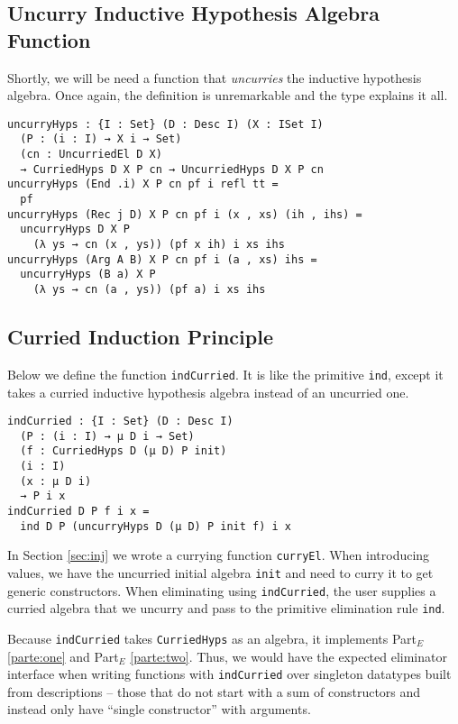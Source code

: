 \documentclass[preprint,nonatbib]{sigplanconf}
\newcommand{\refsec}[1]{Section \ref{sec:#1}}
\newcommand{\refparte}[1]{Part$_E$ \ref{parte:#1}}
\begin{document}
\subsection{Uncurry Inductive Hypothesis Algebra Function}

Shortly, we will be need a function that {\it uncurries} the inductive
hypothesis algebra. Once again, the definition is unremarkable and the
type explains it all.

\begin{verbatim}
uncurryHyps : {I : Set} (D : Desc I) (X : ISet I)
  (P : (i : I) → X i → Set)
  (cn : UncurriedEl D X)
  → CurriedHyps D X P cn → UncurriedHyps D X P cn
uncurryHyps (End .i) X P cn pf i refl tt =
  pf
uncurryHyps (Rec j D) X P cn pf i (x , xs) (ih , ihs) =
  uncurryHyps D X P
    (λ ys → cn (x , ys)) (pf x ih) i xs ihs
uncurryHyps (Arg A B) X P cn pf i (a , xs) ihs =
  uncurryHyps (B a) X P
    (λ ys → cn (a , ys)) (pf a) i xs ihs
\end{verbatim}

\subsection{Curried Induction Principle}

Below we define
the function {\tt indCurried}. It is like the primitive {\tt ind},
except it takes a curried inductive hypothesis algebra instead of an
uncurried one. 

\begin{verbatim}
indCurried : {I : Set} (D : Desc I)
  (P : (i : I) → μ D i → Set)
  (f : CurriedHyps D (μ D) P init)
  (i : I)
  (x : μ D i)
  → P i x
indCurried D P f i x =
  ind D P (uncurryHyps D (μ D) P init f) i x
\end{verbatim}

In \refsec{inj} we wrote a currying function
{\tt curryEl}. When introducing values, we have the uncurried initial
algebra {\tt init} and need to curry it to get generic constructors.
When eliminating using {\tt indCurried},
the user supplies a curried algebra that we uncurry
and pass to the primitive elimination rule {\tt ind}.

Because
{\tt indCurried} takes {\tt CurriedHyps} as an algebra, it implements
\refparte{one} and \refparte{two}.
Thus, we would have the expected eliminator interface when writing
functions with {\tt indCurried} over singleton datatypes built from
descriptions -- those that do not start with a sum of constructors and
instead only have ``single constructor'' with arguments.
\end{document}
